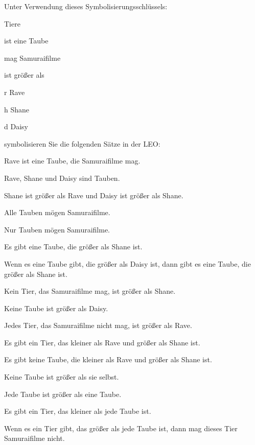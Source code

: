 \problempart 
Unter Verwendung dieses Symbolisierungsschlüssels:
\begin{ekey}
\item[\text{Domäne}] Tiere
\item[\atom{T}{x}]  ist eine Taube
\item[\atom{S}{x}]  mag Samuraifilme
\item[\atom{G}{x,y}]  ist grö{\ss}er als 
\item[r] Rave
\item[h] Shane
\item[d] Daisy
\end{ekey}
symbolisieren Sie die folgenden Sätze in der LEO:
\begin{earg}
\item Rave ist eine Taube, die Samuraifilme mag.
\item Rave, Shane und Daisy sind Tauben.
\item Shane ist grö{\ss}er als Rave und Daisy ist grö{\ss}er als Shane.
\item Alle Tauben mögen Samuraifilme.
\item Nur Tauben mögen Samuraifilme.
\item Es gibt eine Taube, die grö{\ss}er als Shane ist.
\item Wenn es eine Taube gibt, die grö{\ss}er als Daisy ist, dann gibt es eine Taube, die grö{\ss}er als Shane ist.
\item Kein Tier, das Samuraifilme mag, ist grö{\ss}er als Shane.
\item Keine Taube ist grö{\ss}er als Daisy.
\item Jedes Tier, das Samuraifilme nicht mag, ist grö{\ss}er als Rave.
\item Es gibt ein Tier, das kleiner als Rave und grö{\ss}er als Shane ist.
\item Es gibt keine Taube, die kleiner als Rave und grö{\ss}er als Shane ist.
\item Keine Taube ist grö{\ss}er als sie selbst.
\item Jede Taube ist grö{\ss}er als eine Taube.
\item Es gibt ein Tier, das kleiner als jede Taube ist.
\item Wenn es ein Tier gibt, das grö{\ss}er als jede Taube ist, dann mag dieses Tier Samuraifilme nicht.
\end{earg}


